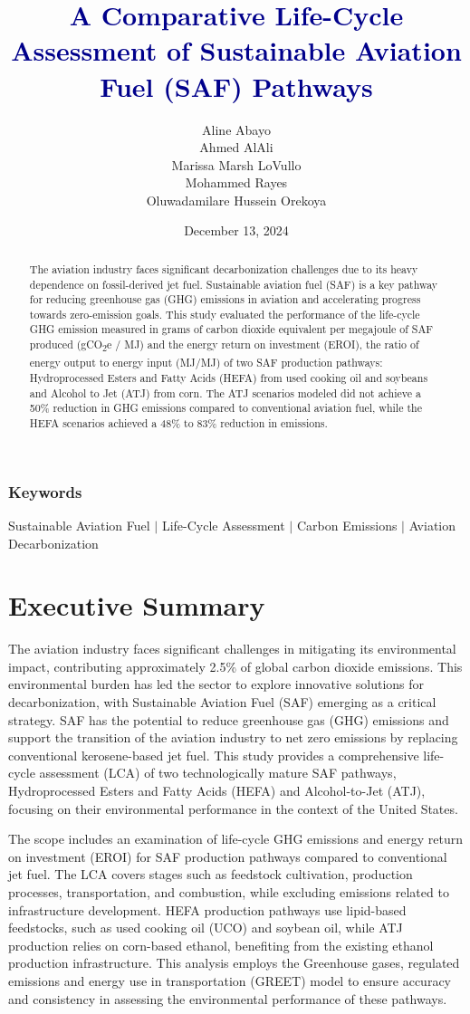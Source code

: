 \documentclass[12pt]{article}
\title{\textbf{\textcolor{DarkBlue}{A Comparative Life-Cycle Assessment of Sustainable Aviation Fuel (SAF) Pathways}}}
\date{December 13, 2024}
\author{
    Aline Abayo \\ 
    Ahmed AlAli \\ 
    Marissa Marsh LoVullo \\ 
    Mohammed Rayes \\ 
    Oluwadamilare Hussein Orekoya
}
\begin{document}
\maketitle

\begin{abstract}
The aviation industry faces significant decarbonization challenges due to its heavy dependence on fossil-derived jet fuel. Sustainable aviation fuel (SAF) is a key pathway for reducing greenhouse gas (GHG) emissions in aviation and accelerating progress towards zero-emission goals. This study evaluated the performance of the life-cycle GHG emission measured in grams of carbon dioxide equivalent per megajoule of SAF produced (gCO\textsubscript{2}e / MJ) and the energy return on investment (EROI), the ratio of energy output to energy input (MJ/MJ) of two SAF production pathways: Hydroprocessed Esters and Fatty Acids (HEFA) from used cooking oil and soybeans and Alcohol to Jet (ATJ) from corn. The ATJ scenarios modeled did not achieve a 50\% reduction in GHG emissions compared to conventional aviation fuel, while the HEFA scenarios achieved a 48\% to 83\% reduction in emissions. 
\end{abstract}

\subsubsection*{Keywords} Sustainable Aviation Fuel $|$ Life-Cycle Assessment $|$ Carbon Emissions $|$ Aviation Decarbonization
\clearpage
\section{Executive Summary}
The aviation industry faces significant challenges in mitigating its environmental impact, contributing approximately 2.5\% of global carbon dioxide emissions. This environmental burden has led the sector to explore innovative solutions for decarbonization, with Sustainable Aviation Fuel (SAF) emerging as a critical strategy. SAF has the potential to reduce greenhouse gas (GHG) emissions and support the transition of the aviation industry to net zero emissions by replacing conventional kerosene-based jet fuel. This study provides a comprehensive life-cycle assessment (LCA) of two technologically mature SAF pathways, Hydroprocessed Esters and Fatty Acids (HEFA) and Alcohol-to-Jet (ATJ), focusing on their environmental performance in the context of the United States.

The scope includes an examination of life-cycle GHG emissions and energy return on investment (EROI) for SAF production pathways compared to conventional jet fuel. The LCA covers stages such as feedstock cultivation, production processes, transportation, and combustion, while excluding emissions related to infrastructure development. HEFA production pathways use lipid-based feedstocks, such as used cooking oil (UCO) and soybean oil, while ATJ production relies on corn-based ethanol, benefiting from the existing ethanol production infrastructure. This analysis employs the Greenhouse gases, regulated emissions and energy use in transportation (GREET) model to ensure accuracy and consistency in assessing the environmental performance of these pathways.
\end{document}
